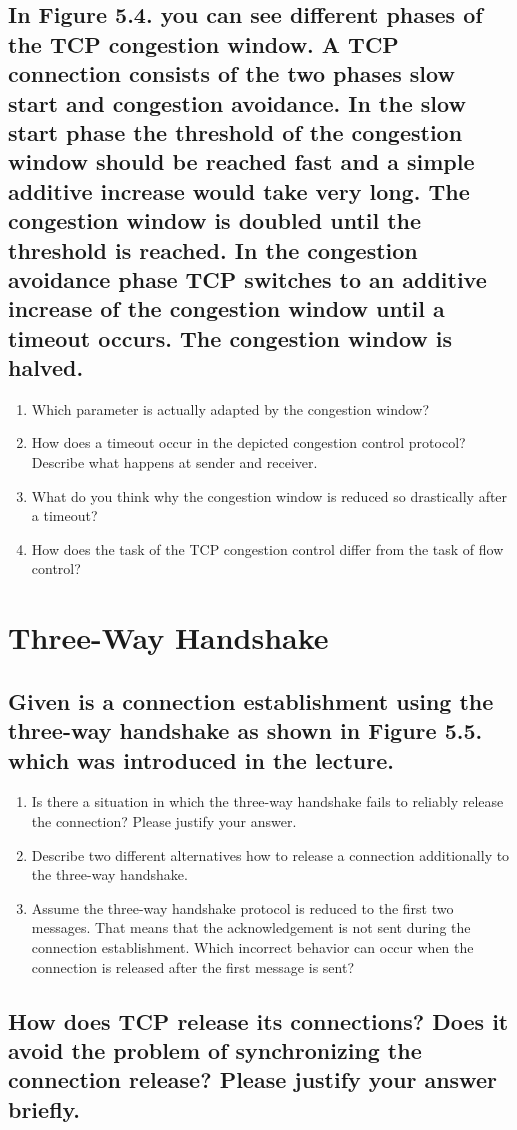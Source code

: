 \documentclass[a4paper,
			llpt,
			solution,
			accentcolor=tud2d,
			colorbacktitle
			]
			{tudexercise}
\begin{document}
\subsection{In Figure 5.4. you can see different phases of the TCP congestion window. A TCP connection consists of the two phases slow start and congestion avoidance. In the slow start phase the threshold of the congestion window should be reached fast and a simple additive increase would take very long. The congestion window is doubled until the threshold is reached. In the congestion avoidance phase TCP switches to an additive increase of the congestion window until a timeout occurs. The congestion window is halved.}
\begin{enumerate}
\item Which parameter is actually adapted by the congestion window?
\item How does a timeout occur in the depicted congestion control protocol? Describe what
happens at sender and receiver.
\item What do you think why the congestion window is reduced so drastically after a timeout?
\item How does the task of the TCP congestion control differ from the task of flow control?
\end{enumerate}
\section{Three-Way Handshake}
\subsection{Given is a connection establishment using the three-way handshake as shown in Figure 5.5. which was introduced in the lecture.}
\begin{enumerate}
\item Is there a situation in which the three-way handshake fails to reliably release the connection?
Please justify your answer.
\item Describe two different alternatives how to release a connection additionally to the three-way
handshake.
\item Assume the three-way handshake protocol is reduced to the first two messages. That means
that the acknowledgement is not sent during the connection establishment. Which incorrect
behavior can occur when the connection is released after the first message is sent?
\end{enumerate}
\subsection{How does TCP release its connections? Does it avoid the problem of synchronizing the connection release? Please justify your answer briefly.}
\end{document}

